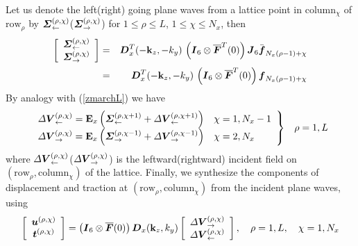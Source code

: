 Let us denote the left(right) going plane waves from a lattice 
point in $\mbox{column}_\chi$ of $\mbox{row}_\rho$ by ${\mbox{\boldmath$\mit \Sigma$\unboldmath}}^{(\rho,\chi)}_{\leftarrow}$(${\mbox{\boldmath$\mit \Sigma$\unboldmath}}^{(\rho,\chi)}_{\rightarrow}$) for 
$1 \le \rho \le L$, $1 \le \chi \le N_x$, then
\begin{eqnarray} \label{LRsource}
\left[\begin{array}{c}
{\mbox{\boldmath$\mit \Sigma$\unboldmath}}^{(\rho,\chi)}_{\leftarrow}\\
{\mbox{\boldmath$\mit \Sigma$\unboldmath}}^{(\rho,\chi)}_{\rightarrow}
\end{array}\right]&=&
{\mbox{\boldmath$\mit D$\unboldmath}}_{x}^{T}(-{\bf k}_{z},-{k}_{y})
\,\left({\mbox{\boldmath$\mit I$\unboldmath}}_6\otimes \overline{\mbox{\boldmath$\mit F$\unboldmath}}^{T}(0)  \right){\mbox{\boldmath$\mit J$\unboldmath}}_6 
\bar{\mbox{\boldmath$\mit f$\unboldmath}}_{N_x(\rho-1)+\chi}\nonumber\\
&=&
{\mbox{\boldmath$\mit D$\unboldmath}}_{x}^{T}(-{\bf k}_{z},-{k}_{y})
\,\left({\mbox{\boldmath$\mit I$\unboldmath}}_6\otimes \overline{\mbox{\boldmath$\mit F$\unboldmath}}^{T}(0)  \right)
{\mbox{\boldmath$\mit f$\unboldmath}}_{N_x(\rho-1)+\chi}
\end{eqnarray}
 By analogy with (\ref{zmarchL}) we have
\begin{equation} \label{xmarchL}
\begin{array}{ll}
\left.\begin{array}{cl}
{\mit \Delta} { \mbox{\boldmath$\mit V$\unboldmath}}_{\leftarrow }^{(\rho,\chi)}  = {\bf E}_{x}\left({{ \mbox{\boldmath$\mit \Sigma$\unboldmath}}_{ \leftarrow }^{(\rho,\chi+1)}+ {\mit \Delta} {\mbox{\boldmath$\mit V$\unboldmath}}_{\leftarrow }^{  
(\rho,\chi+1)}}\right)&\chi=1,N_x-1\\
{\mit \Delta} {\mbox{\boldmath$\mit V$\unboldmath}}_{\rightarrow }^{(\rho,\chi)} ={\bf E}_{x}\left({{ \mbox{\boldmath$\mit \Sigma$\unboldmath}}_{ \rightarrow }^{(\rho,\chi-1)}+ {\mit \Delta} { \mbox{\boldmath$\mit V$\unboldmath}}_{\rightarrow 
}^{(\rho,\chi-1)}}
\right)& \chi=2,N_x
\end{array}\right\}&\rho=1,L
\end{array}
\end{equation} 
where  ${\mit \Delta} { \mbox{\boldmath$\mit V$\unboldmath}}_{\leftarrow }^{(\rho,\chi)}$(${\mit \Delta} { \mbox{\boldmath$\mit V$\unboldmath}}_{\rightarrow }^{(\rho,\chi)}$) is the leftward(rightward) incident field on 
$(\mbox{row}_\rho,\mbox{column}_\chi)$ of the lattice.
Finally, we synthesize the components of displacement and traction at
$(\mbox{row}_\rho,\mbox{column}_\chi)$ from the incident plane waves, using
\begin{eqnarray} \label{utxsyn}
\left[\begin{array}{c}
{\mbox{\boldmath$\mit u$\unboldmath}}^{(\rho,\chi)}\\
{\mbox{\boldmath$\mit t$\unboldmath}}^{(\rho,\chi)}
\end{array}\right]=
\left({\mbox{\boldmath$\mit I$\unboldmath}}_6\otimes \overline{\mbox{\boldmath$\mit F$\unboldmath}}(0)  \right)
 {\mbox{\boldmath$\mit D$\unboldmath}}_{x}({\bf k}_{z},{k}_{y})
 \left[\begin{array}{c}
{\mit \Delta}{\mbox{\boldmath$\mit V$\unboldmath}}^{(\rho,\chi)}_{\rightarrow}\\
{\mit \Delta}{\mbox{\boldmath$\mit V$\unboldmath}}^{(\rho,\chi)}_{\leftarrow}
\end{array}\right], \quad \rho=1,L, \quad \chi=1,N_x
\end{eqnarray}


